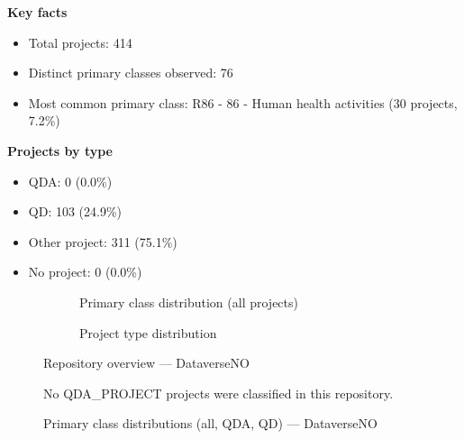 \textbf{Key facts}

\begin{itemize}
    \item Total projects: 414
    \item Distinct primary classes observed: 76
    \item Most common primary class: R86 - 86 - Human health activities (30 projects, 7.2\%)
\end{itemize}

\textbf{Projects by type}

\begin{itemize}
    \item QDA: 0 (0.0\%)
    \item QD: 103 (24.9\%)
    \item Other project: 311 (75.1\%)
    \item No project: 0 (0.0\%)
\end{itemize}

\begin{figure}[H]
    \centering
    \begin{subfigure}[t]{0.49\textwidth}
        \centering
        
        \caption{Primary class distribution (all projects)}
    \end{subfigure}
    \hfill
    \begin{subfigure}[t]{0.49\textwidth}
        \centering
        
        \caption{Project type distribution}
    \end{subfigure}
    \caption{Repository overview --- DataverseNO}
\end{figure}

\clearpage

\begin{figure}[H]
    \centering
    
    \par\vspace{0.8em}
    No QDA\_PROJECT projects were classified in this repository.
    \par\vspace{0.8em}
    
    \caption{Primary class distributions (all, QDA, QD) --- DataverseNO}
\end{figure}

